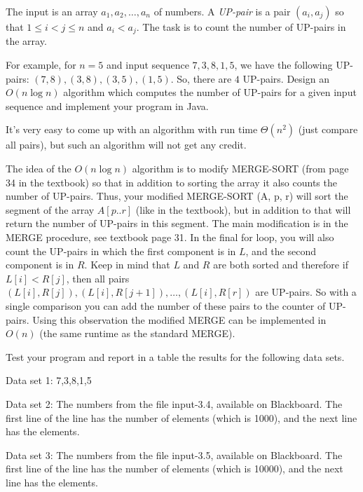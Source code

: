 \documentclass[11pt]{article}
\begin{document}
The input is an array $a_1, a_2, \ldots, a_n$ of numbers.  A  \emph{UP-pair} is a pair $(a_i, a_j)$  so that $1 \le i < j \le n$ and $a_i < a_j$. The task is to count the number of UP-pairs
in the array.

For example, for $n = 5$ and input sequence $7, 3, 8, 1, 5$, we have the following UP-pairs: $(7,8),  (3, 8),  (3, 5),  (1,5)$.  So, there are $4$ UP-pairs. 
Design an $O(n \log n)$ algorithm which computes the number of UP-pairs for a
given input sequence and implement your program in Java.

It's very easy to come up with an algorithm with run time  $\Theta(n^2)$ (just compare all pairs), but such an algorithm will not get any credit.

The idea of the $O(n \log n)$  algorithm is to modify MERGE-SORT (from page 34 in the textbook)  so that in addition to sorting the array it also counts the number of UP-pairs. Thus, your modified MERGE-SORT (A, p, r) will sort the segment of the array $A[p..r]$  (like in the textbook), but in addition to that will return the number of UP-pairs in this segment.  The main modification is in the MERGE  procedure, see textbook page 31. In the final for loop, you will also count the UP-pairs in which the first component is in $L$, and the second component is in $R$. Keep in mind that $L$ and $R$ are both sorted and therefore if $L[i] < R[j]$, then all pairs $(L[i], R[j]),  (L[i], R[j+1]), \ldots, (L[i], R[r])$ are UP-pairs. So with a single comparison you can add the number of these pairs to the counter of UP-pairs. Using this observation the modified MERGE can be implemented in $O(n)$ (the same runtime as the standard MERGE).
\medskip




Test your program and report in a table the results for the following data sets.

Data set 1:  7,3,8,1,5

Data set 2:  The  numbers from the file input-3.4, available on Blackboard. The first line of the line has the number of elements (which is 1000), and the next line has the elements.

Data set 3:  The  numbers from the file input-3.5, available on Blackboard. The first line of the line has the number of elements (which is 10000), and the next line has the elements.

 

 
\end{document}
